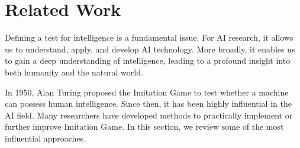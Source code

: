 \section{Related Work}
\label{sec:related_work}

Defining a test for intelligence is a fundamental issue. For AI research, it allows us to understand, apply, and develop AI technology. More broadly, it enables us to gain a deep understanding of intelligence, leading to a profound insight into both humanity and the natural world.

In 1950, Alan Turing proposed the Imitation Game to test whether a machine can possess human intelligence. Since then, it has been highly influential in the AI field. Many researchers have developed methods to practically implement or further improve Imitation Game. In this section, we review some of the most influential approaches. 

